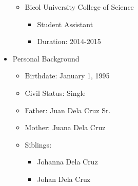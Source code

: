 \begin{itemize}
\begin{itemize}
            \item Bicol University College of Science
                \begin{itemize}
                    \item Student Assistant
                    \item Duration: 2014-2015
                \end{itemize}
        \end{itemize}
    \item Personal Background
        \begin{itemize}
            \item Birthdate: January 1, 1995
            \item Civil Status: Single
            \item Father: Juan Dela Cruz Sr.
            \item Mother: Juana Dela Cruz
            \item Siblings:
                \begin{itemize}
                    \item Johanna Dela Cruz
                    \item Johan Dela Cruz
                \end{itemize}
        \end{itemize}
\end{itemize}

